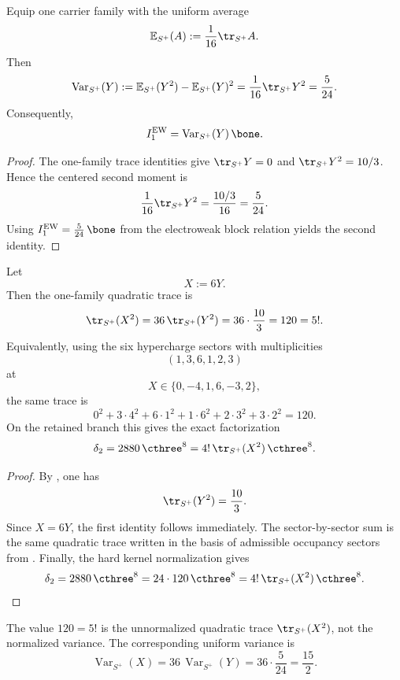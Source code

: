 \begin{corollary}
Equip one carrier family with the uniform average
\[
\mathbb E_{S^+}(A):=\frac{1}{16}\tr_{S^+}A.
\]
Then
\[
\operatorname{Var}_{S^+}(Y)
:=
\mathbb E_{S^+}(Y^2)-\mathbb E_{S^+}(Y)^2
=
\frac{1}{16}\tr_{S^+}Y^2
=
\frac{5}{24}.
\]
Consequently,
\[
I_1^{\mathrm{EW}}=\operatorname{Var}_{S^+}(Y)\,\bone.
\]
\end{corollary}

\begin{proof}
The one-family trace identities give $\tr_{S^+}Y=0$ and $\tr_{S^+}Y^2=10/3$. Hence the centered second moment is
\[
\frac{1}{16}\tr_{S^+}Y^2=\frac{10/3}{16}=\frac{5}{24}.
\]
Using $I_1^{\mathrm{EW}}=\frac{5}{24}\,\bone$ from the electroweak block relation yields the second identity.
\end{proof}

\begin{corollary}
\label{cor:factorial-trace-delta2}
Let
\[
X:=6Y.
\]
Then the one-family quadratic trace is
\[
\tr_{S^+}(X^2)
=
36\,\tr_{S^+}(Y^2)
=
36\cdot\frac{10}{3}
=
120
=
5!.
\]
Equivalently, using the six hypercharge sectors with multiplicities
\[
(1,3,6,1,2,3)
\]
at
\[
X\in\{0,-4,1,6,-3,2\},
\]
the same trace is
\[
0^2+3\cdot 4^2+6\cdot 1^2+1\cdot 6^2+2\cdot 3^2+3\cdot 2^2=120.
\]
On the retained branch this gives the exact factorization
\[
\delta_2
=
2880\,\cthree^8
=
4!\,\tr_{S^+}(X^2)\,\cthree^8.
\]
\end{corollary}

\begin{proof}
By , one has
\[
\tr_{S^+}(Y^2)=\frac{10}{3}.
\]
Since $X=6Y$, the first identity follows immediately. The sector-by-sector sum is the same quadratic trace written in the basis of admissible occupancy sectors from . Finally, the hard kernel normalization gives
\[
\delta_2=2880\,\cthree^8=24\cdot 120\,\cthree^8
=
4!\,\tr_{S^+}(X^2)\,\cthree^8.
\]
\end{proof}

\begin{remark}
The value $120=5!$ is the unnormalized quadratic trace $\tr_{S^+}(X^2)$, not the normalized variance. The corresponding uniform variance is
\[
\operatorname{Var}_{S^+}(X)=36\,\operatorname{Var}_{S^+}(Y)=36\cdot\frac{5}{24}=\frac{15}{2}.
\]
\end{remark}

